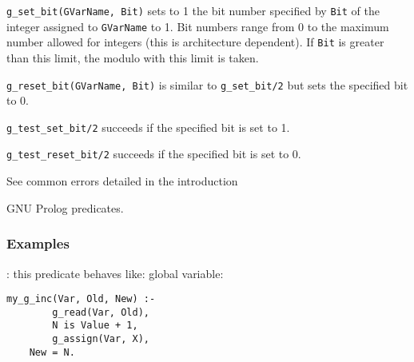\Description

\texttt{g\_set\_bit(GVarName, Bit)} sets to 1 the bit number specified by 
\texttt{Bit} of the integer assigned to \texttt{GVarName} to 1. Bit numbers
range from 0 to the maximum number allowed for integers (this is architecture dependent). If \texttt{Bit} is greater than this limit, 
the modulo with this limit is taken.

\texttt{g\_reset\_bit(GVarName, Bit)} is similar to \texttt{g\_set\_bit/2} but
sets the specified bit to 0.

\texttt{g\_test\_set\_bit/2} succeeds if the specified bit is set to 1.

\texttt{g\_test\_reset\_bit/2} succeeds if the specified bit is set to 0.

\Errors

See common errors detailed in the introduction 

\begin{PlErrorsNoTitle}






\end{PlErrorsNoTitle}

\Portability

GNU Prolog predicates.

\subsubsection{Examples}
\label{Examples}

: this predicate behaves like:
global variable:

\begin{Indentation}
\begin{verbatim}
my_g_inc(Var, Old, New) :-
        g_read(Var, Old),
        N is Value + 1,
        g_assign(Var, X),
	New = N.
\end{verbatim}
\end{Indentation}

